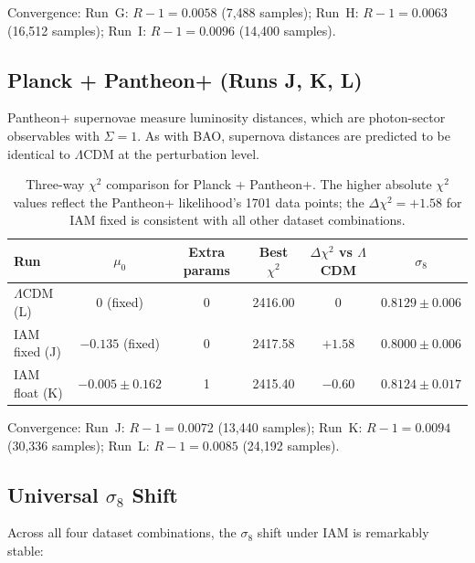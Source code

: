 \documentclass[11pt,letterpaper]{article}
\begin{document}
Convergence: Run~G: $R-1 = 0.0058$ (7{,}488 samples); Run~H: $R-1 = 0.0063$ (16{,}512 samples); Run~I: $R-1 = 0.0096$ (14{,}400 samples).

\subsection{Planck + Pantheon+ (Runs J, K, L)}

Pantheon+ supernovae measure luminosity distances, which are photon-sector observables with $\Sigma = 1$. As with BAO, supernova distances are predicted to be identical to $\Lambda$CDM at the perturbation level.

\begin{table}[h]
\centering
\begin{tabular}{lccccc}
\toprule
Run & $\mu_0$ & Extra params & Best $\chi^2$ & $\Delta\chi^2$ vs $\Lambda$CDM & $\sigma_8$ \\
\midrule
$\Lambda$CDM (L) & 0 (fixed) & 0 & 2416.00 & 0 & $0.8129 \pm 0.006$ \\
IAM fixed (J) & $-0.135$ (fixed) & 0 & 2417.58 & $+1.58$ & $0.8000 \pm 0.006$ \\
IAM float (K) & $-0.005 \pm 0.162$ & 1 & 2415.40 & $-0.60$ & $0.8124 \pm 0.017$ \\
\bottomrule
\end{tabular}
\caption{Three-way $\chi^2$ comparison for Planck + Pantheon+. The higher absolute $\chi^2$ values reflect the Pantheon+ likelihood's 1701 data points; the $\Delta\chi^2 = +1.58$ for IAM fixed is consistent with all other dataset combinations.}
\label{tab:comparison_pantheon}
\end{table}

Convergence: Run~J: $R-1 = 0.0072$ (13{,}440 samples); Run~K: $R-1 = 0.0094$ (30{,}336 samples); Run~L: $R-1 = 0.0085$ (24{,}192 samples).

\subsection{Universal $\sigma_8$ Shift}

Across all four dataset combinations, the $\sigma_8$ shift under IAM is remarkably stable:
\end{document}
